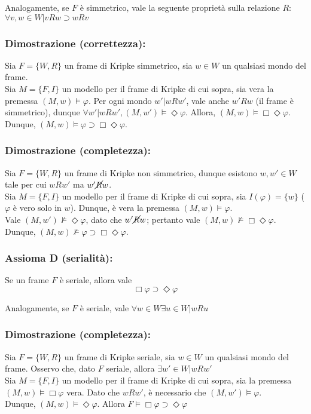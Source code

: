 Analogamente, se $F$ è simmetrico, vale la seguente proprietà sulla relazione $R$: $\forall v, w \in W | vRw \supset wRv$

\subsubsection{Dimostrazione (correttezza):}
Sia $F = \lbrace W, R \rbrace$ un frame di Kripke simmetrico, sia $w \in W$ un qualsiasi mondo del frame. \\
Sia $M = \lbrace F, I \rbrace$ un modello per il frame di Kripke di cui sopra, sia vera la premessa $(M, w) \models \varphi$. Per ogni mondo $w' | wRw'$, vale anche $w'Rw$ (il frame è simmetrico), dunque $\forall w' | wRw', (M, w') \models \Diamond \varphi$. Allora, $(M, w) \models \Box \Diamond \varphi$.\\
Dunque, $(M, w) \models \varphi \supset \Box \Diamond \varphi$.

\subsubsection{Dimostrazione (completezza):}
Sia $F = \lbrace W, R \rbrace$ un frame di Kripke non simmetrico, dunque esistono $w, w' \in W$ tale per cui $wRw'$ ma $w'\cancel{R}w$.\\
Sia $M = \lbrace F, I \rbrace$ un modello per il frame di Kripke di cui sopra, sia $I(\varphi) = \{w\}$ ($\varphi$ è vero solo in $w$). Dunque, è vera la premessa $(M, w) \models \varphi$.\\
Vale $(M, w') \not \models \Diamond \varphi$, dato che $w'\cancel{R}w$; pertanto vale $(M, w) \not \models \Box \Diamond \varphi$.
Dunque, $(M, w) \not \models \varphi \supset \Box \Diamond \varphi$.

\subsubsection{Assioma D (serialità):} Se un frame $F$ è seriale, allora vale $$\Box \varphi \supset \Diamond \varphi$$

Analogamente, se $F$ è seriale, vale $\forall w \in W \exists u \in W | wRu$

\subsubsection{Dimostrazione (completezza):}
Sia $F = \lbrace W, R \rbrace$ un frame di Kripke seriale, sia $w \in W$ un qualsiasi mondo del frame. Osservo che, dato $F$ seriale, allora $\exists w' \in W | wRw'$\\
Sia $M = \lbrace F, I \rbrace$ un modello per il frame di Kripke di cui sopra, sia la premessa $(M, w) \models \Box \varphi$ vera. Dato che $wRw'$, è necessario che $(M, w') \models \varphi$.\\
Dunque, $(M, w) \models \Diamond \varphi$. Allora $F \models \Box \varphi \supset \Diamond \varphi$

